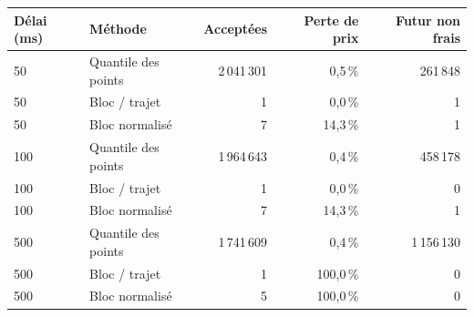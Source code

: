 \begin{tabular}{@{}llrrr@{}}
\toprule
Délai (ms) & Méthode & Acceptées & Perte de prix & Futur non frais\\
\midrule
50 & Quantile des points & 2\,041\,301 & 0,5\,\% & 261\,848\\
50 & Bloc / trajet & 1 & 0,0\,\% & 1\\
50 & Bloc normalisé & 7 & 14,3\,\% & 1\\
100 & Quantile des points & 1\,964\,643 & 0,4\,\% & 458\,178\\
100 & Bloc / trajet & 1 & 0,0\,\% & 0\\
100 & Bloc normalisé & 7 & 14,3\,\% & 1\\
500 & Quantile des points & 1\,741\,609 & 0,4\,\% & 1\,156\,130\\
500 & Bloc / trajet & 1 & 100,0\,\% & 0\\
500 & Bloc normalisé & 5 & 100,0\,\% & 0\\
\bottomrule
\end{tabular}
